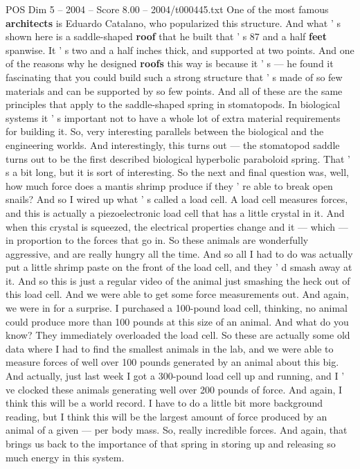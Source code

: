 \begin{textsample}{POS Dim 5 – 2004 – Score 8.00 – 2004/t000445.txt}
One of the most famous \textbf{architects} is Eduardo Catalano, who popularized this structure.
And what ' s shown here is a saddle-shaped \textbf{roof} that he built that ' s 87 and a half \textbf{feet} spanwise.
It ' s two and a half inches thick, and supported at two points.
And one of the reasons why he designed \textbf{roofs} this way is because it ' s — he found it fascinating that you could build such a strong structure that ' s made of so few materials and can be supported by so few points.
And all of these are the same principles that apply to the saddle-shaped spring in stomatopods.
In biological systems it ' s important not to have a whole lot of extra material requirements for building it.
So, very interesting parallels between the biological and the engineering worlds.
And interestingly, this turns out — the stomatopod saddle turns out to be the first described biological hyperbolic paraboloid spring.
That ' s a bit long, but it is sort of interesting.
So the next and final question was, well, how much force does a mantis shrimp produce if they ' re able to break open snails?
And so I wired up what ' s called a load cell.
A load cell measures forces, and this is actually a piezoelectronic load cell that has a little crystal in it.
And when this crystal is squeezed, the electrical properties change and it — which — in proportion to the forces that go in.
So these animals are wonderfully aggressive, and are really hungry all the time.
And so all I had to do was actually put a little shrimp paste on the front of the load cell, and they ' d smash away at it.
And so this is just a regular video of the animal just smashing the heck out of this load cell.
And we were able to get some force measurements out.
And again, we were in for a surprise.
I purchased a 100-pound load cell, thinking, no animal could produce more than 100 pounds at this size of an animal.
And what do you know?
They immediately overloaded the load cell.
So these are actually some old data where I had to find the smallest animals in the lab, and we were able to measure forces of well over 100 pounds generated by an animal about this big.
And actually, just last week I got a 300-pound load cell up and running, and I ' ve clocked these animals generating well over 200 pounds of force.
And again, I think this will be a world record.
I have to do a little bit more background reading, but I think this will be the largest amount of force produced by an animal of a given — per body mass.
So, really incredible forces.
And again, that brings us back to the importance of that spring in storing up and releasing so much energy in this system.

\end{textsample}
